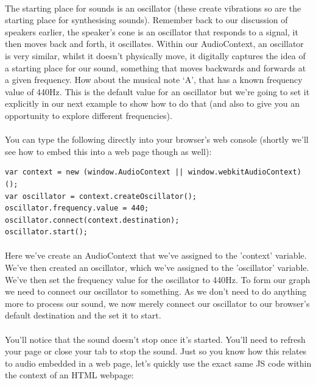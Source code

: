 \paragraph{} The starting place for sounds is an oscillator (these create vibrations so are the starting place for synthesising sounds). Remember back to our discussion of speakers earlier, the speaker's cone is an oscillator that responds to a signal, it then moves back and forth, it oscillates. Within our AudioContext, an oscillator is very similar, whilst it doesn't physically move, it digitally captures the idea of a starting place for our sound, something that moves backwards and forwards at a given frequency. How about the musical note ‘A’, that has a known frequency value of 440Hz. This is the default value for an oscillator but we're going to set it explicitly in our next example to show how to do that (and also to give you an opportunity to explore different frequencies).
\paragraph{} You can type the following directly into your browser's web console (shortly we'll see how to embed this into a web page though as well):

\begin{lstlisting}
var context = new (window.AudioContext || window.webkitAudioContext)();
var oscillator = context.createOscillator();
oscillator.frequency.value = 440;
oscillator.connect(context.destination);
oscillator.start();
\end{lstlisting}

\paragraph{} Here we've create an AudioContext that we've assigned to the 'context' variable. We've then created an oscillator, which we've assigned to the 'oscillator' variable. We've then set the frequency value for the oscillator to 440Hz. To form our graph we need to connect our oscillator to something. As we don't need to do anything more to process our sound, we now merely connect our oscillator to our browser's default destination and the set it to start.

\paragraph{} You'll notice that the sound doesn't stop once it's started. You'll need to refresh your page or close your tab to stop the sound. Just so you know how this relates to audio embedded in a web page, let's quickly use the exact same JS code within the context of an HTML webpage:

